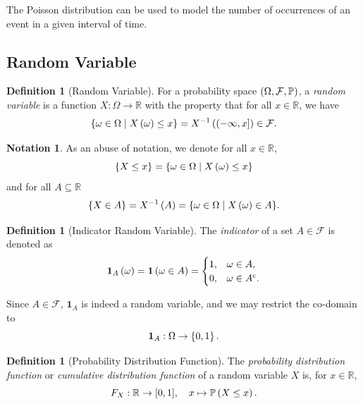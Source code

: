 \documentclass{article}
\theoremstyle{definition}
\newtheorem{definition}[theorem]{Definition}
\newtheorem{notation}[theorem]{Notation}
\theoremstyle{remark}
\newcommand{\RR}{\mathbb{R}}
\newcommand{\Prob}{\mathbb{P}}
\newcommand{\eventSpace}{\mathcal{F}}
\newcommand{\compl}{^{\mathrm{c}}}
\newcommand{\inverse}{^{-1}}
\newcommand{\indicator}{\mathbf{1}}
\newcommand{\ccintv}[2]{[#1,#2]}
\newcommand{\ocintv}[2]{(#1,#2]}
\newcommand{\set}[2]{\{#1\mid #2\}}
\newcommand{\functiondomain}[3]{#1:#2\to #3}
\newcommand{\function}[5]{#1:#2\to #3,\quad #4\mapsto #5}
\begin{document}
The Poisson distribution can be used to model the number of occurrences of an event in a given interval of time.

\subsection{Random Variable}

\begin{definition}[Random Variable]
    \label{def:random-variable}%
    For a probability space \(\pqty{\Omega, \eventSpace, \Prob}\), a \emph{random variable} is a function \(\functiondomain{X}{\Omega}{\RR}\) with the property that for all \(x \in \RR\), we have
    \[
        \set{\omega \in \Omega}{X\pqty{\omega} \leq x} = X\inverse \pqty{\ocintv{-\infty}{x}} \in \eventSpace.
    \]
\end{definition}

\begin{notation}
    As an abuse of notation, we denote for all \(x \in \RR\),
    \[
        \Bqty{X \leq x} = \set{\omega \in \Omega}{X\pqty{\omega} \leq x}
    \]
    and for all \(A \subseteq \RR\)
    \[
        \Bqty{X \in A} = X\inverse\pqty{A} = \set{\omega \in \Omega}{X\pqty{\omega} \in A}.
    \]
\end{notation}

\begin{definition}[Indicator Random Variable]
    \label{def:indicator-random-variable}%
    The \emph{indicator} of a set \(A \in \eventSpace\) is denoted as
    \[
        \indicator_{A} \pqty{\omega} = \indicator\pqty{\omega \in A} = \begin{cases}
            1, & \omega \in A, \\ 0, & \omega \in A\compl.
        \end{cases}
    \]

    Since \(A \in \eventSpace\), \(\indicator_{A}\) is indeed a random variable, and we may restrict the co-domain to
    \[
        \functiondomain{\indicator_{A}}{\Omega}{\Bqty{0, 1}}.
    \]
\end{definition}


\begin{definition}[Probability Distribution Function]
    \label{def:probability-distribution-function}%
    The \emph{probability distribution function} or \emph{cumulative distribution function} of a random variable \(X\) is, for \(x \in \RR\),
    \[
        \function{F_X}{\RR}{\ccintv{0}{1}}{x}{\Prob\pqty{X \leq x}.}
    \]
\end{definition}
\end{document}
